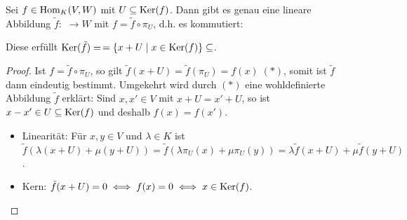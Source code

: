\begin{theorem}[Homomorphiesatz]
	Sei $f\in \operatorname{Hom}_K(V,W)$ mit $U\subseteq \operatorname{Ker}(f)$. Dann gibt es genau eine lineare Abbildung $\tilde f:$
	$\to W$ mit $f=\tilde f \circ \pi_U$, d.h. es kommutiert: \\
	\begin{center}
	\end{center}
	Diese erfüllt $\operatorname{Ker}(\tilde f)=$$=\{x+U\mid x\in \operatorname{Ker}(f)\}\subseteq$.
\end{theorem}
\begin{proof}
	Ist $f=\tilde f\circ \pi_U$, so gilt $\tilde f(x+U)=\tilde f(\pi_U)=f(x)\; (*)$, somit ist $\tilde f$ dann eindeutig bestimmt. Umgekehrt 
	wird durch $(*)$ eine wohldefinierte Abbildung $\tilde f$ erklärt: Sind $x,x'\in V$ mit $x+U=x'+U$, so ist $x-x'\in U\subseteq \operatorname{Ker}(f)$ und 
	deshalb $f(x)=f(x')$. \\
	\begin{itemize}
		\item Linearität: Für $x,y\in V$ und $\lambda\in K$ ist $\tilde f(\lambda(x+U)+\mu(y+U))=\tilde f(\lambda\pi_U(x)+\mu\pi_U(y))=\lambda\tilde f
		(x+U)+\mu\tilde f(y+U)$.
		\item Kern: $\tilde f(x+U)=0\iff f(x)=0 \iff x\in \operatorname{Ker}(f)$.
	\end{itemize}
\end{proof}